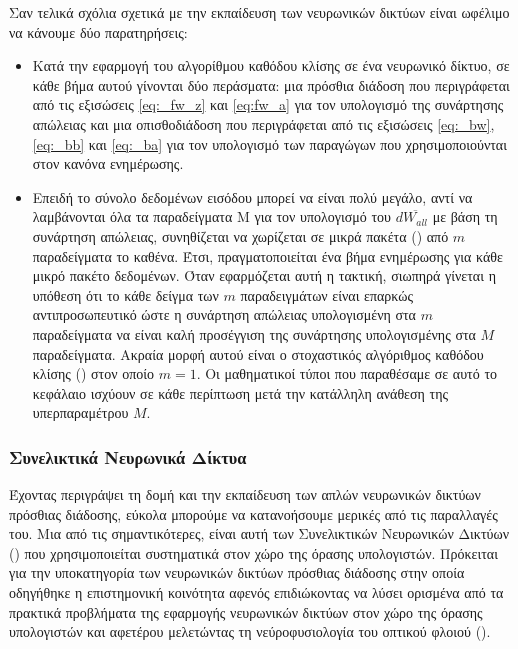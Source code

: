Σαν τελικά σχόλια σχετικά με την εκπαίδευση των νευρωνικών δικτύων είναι ωφέλιμο να κάνουμε δύο παρατηρήσεις:
\begin{itemize}
  \item Κατά την εφαρμογή του αλγορίθμου καθόδου κλίσης σε ένα νευρωνικό δίκτυο, σε κάθε βήμα αυτού γίνονται δύο περάσματα: μια πρόσθια διάδοση που περιγράφεται από τις εξισώσεις \ref{eq:_fw_z} και \ref{eq:fw_a} για τον υπολογισμό της συνάρτησης απώλειας και μια οπισθοδιάδοση που περιγράφεται από τις εξισώσεις \ref{eq:_bw}, \ref{eq:_bb} και \ref{eq:_ba} για τον υπολογισμό των παραγώγων που χρησιμοποιούνται στον κανόνα ενημέρωσης.
  \item Επειδή το σύνολο δεδομένων εισόδου μπορεί να είναι πολύ μεγάλο, αντί να λαμβάνονται όλα τα παραδείγματα Μ για τον υπολογισμό του $d\overline{W_{all}}$ με βάση τη συνάρτηση απώλειας, συνηθίζεται να χωρίζεται σε μικρά πακέτα () από $m$ παραδείγματα το καθένα. Έτσι, πραγματοποιείται ένα βήμα ενημέρωσης για κάθε μικρό πακέτο δεδομένων. Όταν εφαρμόζεται αυτή η τακτική, σιωπηρά γίνεται η υπόθεση ότι το κάθε δείγμα των $m$ παραδειγμάτων είναι επαρκώς αντιπροσωπευτικό ώστε η συνάρτηση απώλειας υπολογισμένη στα $m$ παραδείγματα να είναι καλή προσέγγιση της συνάρτησης υπολογισμένης στα $M$ παραδείγματα. Ακραία μορφή αυτού είναι ο στοχαστικός αλγόριθμος καθόδου κλίσης () στον οποίο $m=1$. Οι μαθηματικοί τύποι που παραθέσαμε σε αυτό το κεφάλαιο ισχύουν σε κάθε περίπτωση μετά την κατάλληλη ανάθεση της υπερπαραμέτρου $M$.
\end{itemize}

\subsubsection{Συνελικτικά Νευρωνικά Δίκτυα}
\label{sec:_cnn}
Έχοντας περιγράψει τη δομή και την εκπαίδευση των απλών νευρωνικών δικτύων πρόσθιας διάδοσης, εύκολα μπορούμε να κατανοήσουμε μερικές από τις παραλλαγές του. Μια από τις σημαντικότερες, είναι αυτή των Συνελικτικών Νευρωνικών Δικτύων () που χρησιμοποιείται συστηματικά στον χώρο της όρασης υπολογιστών. Πρόκειται για την υποκατηγορία των νευρωνικών δικτύων πρόσθιας διάδοσης στην οποία οδηγήθηκε η επιστημονική κοινότητα αφενός επιδιώκοντας να λύσει ορισμένα από τα πρακτικά προβλήματα της εφαρμογής νευρωνικών δικτύων στον χώρο της όρασης υπολογιστών και αφετέρου μελετώντας τη νεύρο\textendash φυσιολογία του οπτικού φλοιού ().\par

